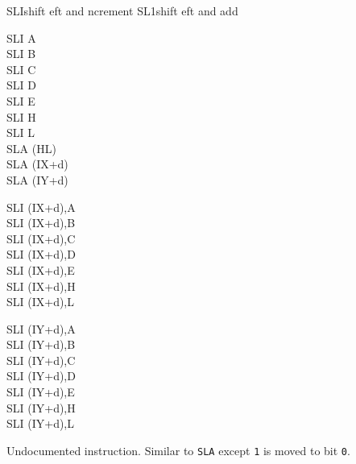 \begin{basedescript}{
	\desclabelstyle{\multilinelabel}
	\desclabelwidth{3cm}}
	\begin{DetailItemMultiline}
		{SLI}{s\UNDOC}{hift eft and ncrement}
		{SL1}{s\UNDOC}{hift eft and add }
		{}
		
		\begin{DetailVariants}
			SLI A\\
			SLI B\\
			SLI C\\
			SLI D\\
			SLI E\\
			SLI H\\
			SLI L\\
			SLA (HL)\\
			SLA (IX+d)\\
			SLA (IY+d)

			\columnbreak
			SLI (IX+d),A\UNDOC\\
			SLI (IX+d),B\UNDOC\\
			SLI (IX+d),C\UNDOC\\
			SLI (IX+d),D\UNDOC\\
			SLI (IX+d),E\UNDOC\\
			SLI (IX+d),H\UNDOC\\
			SLI (IX+d),L\UNDOC

			\columnbreak
			SLI (IY+d),A\UNDOC\\
			SLI (IY+d),B\UNDOC\\
			SLI (IY+d),C\UNDOC\\
			SLI (IY+d),D\UNDOC\\
			SLI (IY+d),E\UNDOC\\
			SLI (IY+d),H\UNDOC\\
			SLI (IY+d),L\UNDOC
		\end{DetailVariants}

		Undocumented instruction. Similar to {\tt SLA} except {\tt 1} is moved to bit {\tt 0}.

		\begin{DetailEffects}[p]
			\FlagsSLIr
		\end{DetailEffects}

		\begin{DetailEffectsFlags}
			\DetailFlagSF{\DetailFlagResultSign}
			\DetailFlagZF{\DetailFlagResultZero}
			\DetailFlagPV{\DetailFlagResultParity}
		\end{DetailEffectsFlags}

		\begin{DetailTiming}
		\end{DetailTiming}


\end{DetailItemMultiline}
\end{basedescript}
